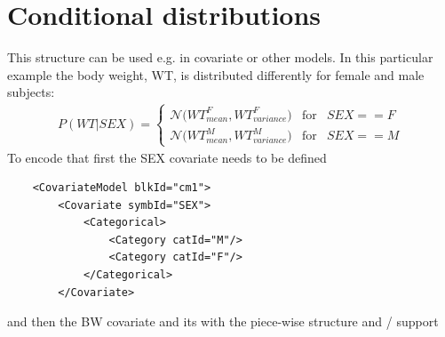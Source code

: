 \section{Conditional distributions}
\label{sec:condDistros}
This structure can be used e.g. in covariate or other models. In this 
particular example the body weight, WT, is distributed differently for female and male subjects: 
\begin{align}
P(WT|SEX) = 
\left\{ \begin{array}{rcl}     
\mathcal N \big(WT^F_{mean}, WT^F_{variance}\big) & \mbox{for} & SEX == F \\  
\mathcal N \big(WT^M_{mean}, WT^M_{variance}\big) & \mbox{for} & SEX == M
\end{array}\right. \nonumber
\end{align}
To encode that first the SEX covariate needs to be defined 
\lstset{language=XML}
\begin{lstlisting}
    <CovariateModel blkId="cm1">
        <Covariate symbId="SEX">
            <Categorical>
                <Category catId="M"/>
                <Category catId="F"/>
            </Categorical>
        </Covariate>
\end{lstlisting}
and then the BW covariate and its  with the piece-wise
structure and / support
\lstset{language=XML}
